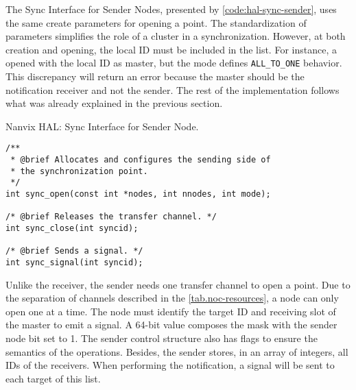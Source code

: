 				The Sync Interface for Sender Nodes, presented by
				\autoref{code:hal-sync-sender}, uses the same create parameters for
				opening a \sync point. The standardization of parameters simplifies
				the role of a cluster in a synchronization. However, at both creation
				and opening, the local ID must be included in the list. For instance,
				a \sync opened with the local ID as master, but the mode defines
				\texttt{ALL\_TO\_ONE} behavior. This discrepancy will return an error
				because the master should be the notification receiver and not the
				sender. The rest of the implementation follows what was already
				explained in the previous section.

\begin{listing}[!tb]
\caption{Nanvix HAL: Sync Interface for Sender Node.}
\label{code:hal-sync-sender}
\begin{verbatim}
/**
 * @brief Allocates and configures the sending side of
 * the synchronization point.
 */
int sync_open(const int *nodes, int nnodes, int mode);

/* @brief Releases the transfer channel. */
int sync_close(int syncid);

/* @brief Sends a signal. */
int sync_signal(int syncid);
\end{verbatim}
\end{listing}


				Unlike the receiver, the sender needs one \cnoc transfer channel to
				open a \sync point. Due to the separation of channels described in
				the \autoref{tab.noc-resources}, a node can only open one \sync at
				a time. The node must identify the target ID and receiving slot of
				the master to emit a signal. A 64-bit value composes the mask with
				the sender node bit set to 1. The sender control structure also has
				flags to ensure the semantics of the operations. Besides, the sender
				stores, in an array of integers, all IDs of the receivers. When
				performing the notification, a signal will be sent to each target
				of this list.

